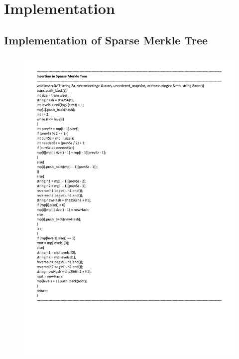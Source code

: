 \section{Implementation}
\large
\subsection{Implementation of Sparse Merkle Tree}

 


\begin{figure}[H]
    \centering
    \includegraphics[scale=0.65]{figures/smt_insert1.pdf}
 
\end{figure}


